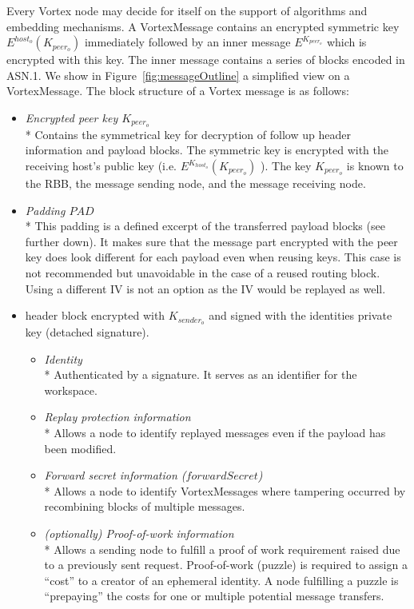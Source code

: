 \documentclass[10pt,journal,compsoc,twocolumn,twoside]{IEEEtran}
\begin{document}
Every Vortex node may decide for itself on the support of algorithms and embedding mechanisms. A VortexMessage contains an encrypted symmetric key $E^{host_o}\left(K_{peer_o}\right)$ immediately followed by an inner message $E^{K_{peer_o}}$ which is encrypted with this key. The inner message contains a series of blocks encoded in ASN.1. We show in Figure~\ref{fig:messageOutline} a simplified view on a VortexMessage. The block structure of a Vortex message is as follows:
\begin{itemize}
	\item \emph{Encrypted peer key $K_{peer_o}$}\\*
	Contains the symmetrical key for decryption of follow up header information and payload blocks. The symmetric key is encrypted with the receiving host's public key (i.e. $E^{K_{host_o}}\left(K_{peer_o}\right)$ ). The key $K_{peer_o}$ is known to the RBB, the message sending node, and the message receiving node.
	\item \emph{Padding $PAD$}\\*
	This padding is a defined excerpt of the transferred payload blocks (see further down). It makes sure that the message part encrypted with the peer key does look different for each payload even when reusing keys. This case is not recommended but unavoidable in the case of a reused routing block. Using a different IV is not an option as the IV would be replayed as well.
	\item header block encrypted with $K_{sender_o}$ and signed with the identities private key (detached signature).
	\begin{itemize}
		\item \emph{Identity}\\*
		Authenticated by a signature. It serves as an identifier for the workspace.
		\item \emph{Replay protection information}\\*
		Allows a node to identify replayed messages even if the payload has been modified.
		\item \emph{Forward secret information ($forwardSecret$)}\\*
		Allows a node to identify VortexMessages where tampering occurred by recombining blocks of multiple messages.      
		\item \emph{(optionally) Proof-of-work information}\\*
		Allows a sending node to fulfill a proof of work requirement raised due to a previously sent request. Proof-of-work (puzzle) is required to assign a ``cost'' to a creator of an ephemeral identity. A node fulfilling a puzzle is ``prepaying'' the costs for one or multiple potential message transfers. 

\end{itemize}
\end{itemize}
\end{document}

